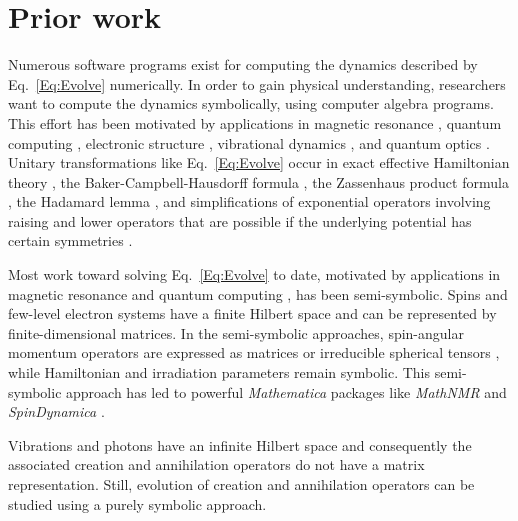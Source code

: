 \section{Prior work}

Numerous software programs exist for computing the dynamics described by Eq.~\ref{Eq:Evolve} numerically.
In order to gain physical understanding, researchers want to compute the dynamics symbolically, using computer algebra programs.
This effort has been motivated by applications in magnetic resonance \cite{Shriver1991oct,Kanters1993jan,Guntert1993jan,Isbister1995dec,Rodriguez2001jan,Guntert2006aug,Anand2007dec,Kuprov2007feb,Filip2010nov}, 
quantum computing \cite{Loke2011oct,Chen2013mar,Loke2013dec},
electronic structure \cite{Zitko2011oct},
vibrational dynamics \cite{Aleixo2011aug}, and 
quantum optics \cite{Beskrovnyi1998jun,Nguyen1998dec}.
Unitary transformations like Eq.~\ref{Eq:Evolve} occur in exact effective Hamiltonian theory \cite{Untidt2002jan,Siminovitch2004jan}, 
the Baker-Campbell-Hausdorff formula \cite{Weyrauch2009sep,Aleixo2011aug},
the Zassenhaus product formula \cite{Weyrauch2009sep,Aleixo2011aug, Casas2012nov}, 
the Hadamard lemma \cite{Aleixo2011aug}, and 
simplifications of exponential operators involving raising and lower operators that are possible if the underlying potential has certain symmetries \cite{Aleixo2011aug}.

Most work toward solving Eq.~\ref{Eq:Evolve} to date, motivated by applications in magnetic resonance 
and quantum computing%
, has been semi-symbolic.
Spins and few-level electron systems have a finite Hilbert space and can be represented by finite-dimensional matrices.
In the semi-symbolic approaches, spin-angular momentum operators are expressed as matrices \cite{Isbister1995dec,Rodriguez2001jan,Loke2011oct,Chen2013mar,Loke2013dec,Bengs2017sep}
or irreducible spherical tensors \cite{Jerschow2005sep,Kuprov2007feb,Anand2007dec,Bengs2017sep},
while Hamiltonian and irradiation parameters remain symbolic. 
This semi-symbolic approach has led to powerful \emph{Mathematica} packages like \emph{MathNMR} \cite{Jerschow2005sep} and \emph{SpinDynamica} \cite{Bengs2017sep}.

Vibrations and photons have an infinite Hilbert space and consequently the associated creation and annihilation operators do not have a matrix representation.
Still, evolution of creation and annihilation operators can be studied using a purely symbolic approach.

